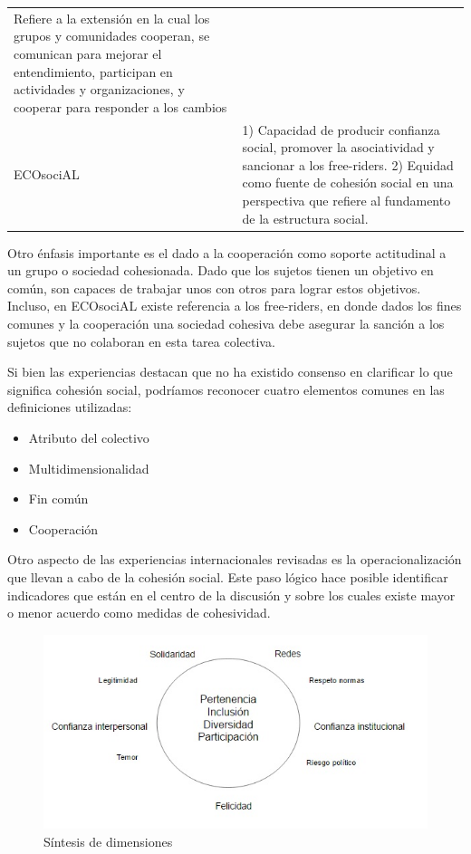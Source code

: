 \documentclass[
  12pt,
]{book}
\providecommand{\tightlist}{%
  \setlength{\itemsep}{0pt}\setlength{\parskip}{0pt}}
\begin{document}
\begin{longtable}[]{@{}ll@{}}
\begin{minipage}[t]{0.85\columnwidth}
Refiere a la extensión en la cual los grupos y comunidades cooperan, se comunican para mejorar el entendimiento, participan en actividades y organizaciones, y cooperar para responder a los cambios\strut
\end{minipage}\tabularnewline
\begin{minipage}[t]{0.10\columnwidth}\raggedright
ECOsociAL\strut
\end{minipage} & \begin{minipage}[t]{0.85\columnwidth}\raggedright
1) Capacidad de producir confianza social, promover la asociatividad y sancionar a los free-riders. 2) Equidad como fuente de cohesión social en una perspectiva que refiere al fundamento de la estructura social.\strut
\end{minipage}\tabularnewline
\bottomrule
\end{longtable}

Otro énfasis importante es el dado a la cooperación como soporte actitudinal a un grupo o sociedad cohesionada. Dado que los sujetos tienen un objetivo en común, son capaces de trabajar unos con otros para lograr estos objetivos. Incluso, en ECOsociAL existe referencia a los free-riders, en donde dados los fines comunes y la cooperación una sociedad cohesiva debe asegurar la sanción a los sujetos que no colaboran en esta tarea colectiva.

Si bien las experiencias destacan que no ha existido consenso en clarificar lo que significa cohesión social, podríamos reconocer cuatro elementos comunes en las definiciones utilizadas:

\begin{itemize}
\tightlist
\item
  Atributo del colectivo
\item
  Multidimensionalidad
\item
  Fin común
\item
  Cooperación
\end{itemize}

Otro aspecto de las experiencias internacionales revisadas es la operacionalización que llevan a cabo de la cohesión social. Este paso lógico hace posible identificar indicadores que están en el centro de la discusión y sobre los cuales existe mayor o menor acuerdo como medidas de cohesividad.

\begin{figure}[H]

{\centering \includegraphics[width=0.75\linewidth]{inputs/images/comun} 

}

\caption{Síntesis de dimensiones}\label{fig:dimensiones}
\end{figure}
\end{document}
